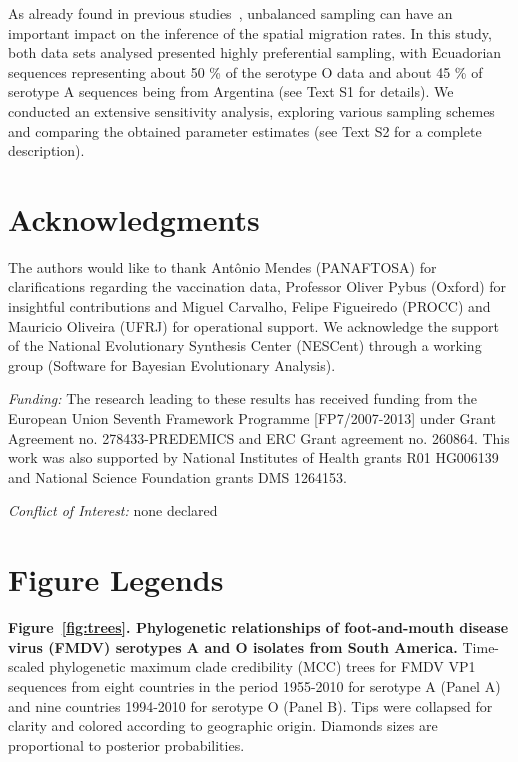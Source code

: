 \documentclass[10pt]{article}
\begin{document}
As already found in previous studies~\cite{Faria2012, Lemey2014}, unbalanced sampling can have an important impact on the inference of the spatial migration rates.
In this study, both data sets analysed presented highly preferential sampling, with Ecuadorian sequences representing about 50 \% of the serotype O data and about 45 \% of serotype A sequences being from Argentina (see Text S1 for details).
We conducted an extensive sensitivity analysis, exploring various sampling schemes and comparing the obtained parameter estimates (see Text S2 for a complete description).

\section*{Acknowledgments}

The authors would like to thank Ant\^onio Mendes (PANAFTOSA) for clarifications regarding the vaccination data, Professor Oliver Pybus (Oxford) for insightful contributions and Miguel Carvalho, Felipe Figueiredo (PROCC) and Mauricio Oliveira (UFRJ) for operational support.
We acknowledge the support of the National Evolutionary Synthesis Center (NESCent) through a working group (Software for Bayesian Evolutionary Analysis).

\emph{Funding:} The research leading to these results has received funding from the European Union Seventh Framework Programme [FP7/2007-2013] under Grant Agreement no. 278433-PREDEMICS and ERC Grant agreement no. 260864.
This work was also supported by National Institutes of Health grants R01 HG006139 and National Science Foundation grants DMS 1264153.

\emph{Conflict of Interest:} none declared

\newpage

\newpage
\section*{Figure Legends}
{\bf Figure~\ref{fig:trees}. Phylogenetic relationships of foot-and-mouth disease virus (FMDV) serotypes A and O isolates from South America.} Time-scaled phylogenetic maximum clade credibility (MCC) trees for FMDV VP1 sequences from eight countries in the period 1955-2010 for serotype A (Panel A) and nine countries 1994-2010 for serotype O (Panel B).
Tips were collapsed for clarity and colored according to geographic origin.
Diamonds sizes are proportional to posterior probabilities.
\end{document}
